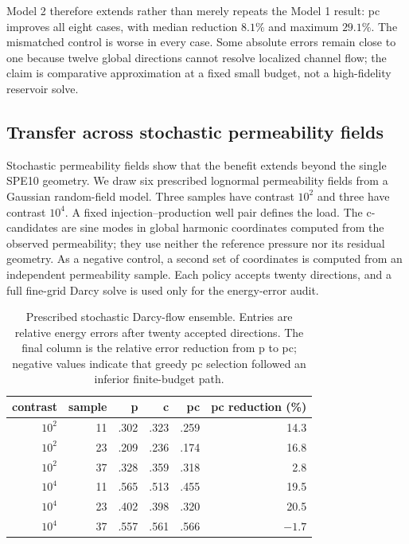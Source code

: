 \documentclass[11pt]{article}
\numberwithin{algorithm}{section}
\theoremstyle{definition}\newtheorem{definition}[theorem]{Definition}
\theoremstyle{remark}\newtheorem{remark}[theorem]{Remark}
\begin{document}
Model 2 therefore extends rather than merely repeats the Model 1 result: pc
improves all eight cases, with median reduction $8.1\%$ and maximum $29.1\%$.
The mismatched control is worse in every case.  Some absolute errors remain
close to one because twelve global directions cannot resolve localized
channel flow; the claim is comparative approximation at a fixed small budget,
not a high-fidelity reservoir solve.

\subsection{Transfer across stochastic permeability fields}
Stochastic permeability fields show that the benefit extends beyond the
single SPE10 geometry.  We draw six prescribed lognormal permeability fields from
a Gaussian random-field model.  Three samples have contrast $10^2$ and
three have contrast $10^4$.  A fixed injection--production well pair defines
the load.  The c-candidates are sine modes in global harmonic coordinates
computed from the observed permeability; they use neither the reference
pressure nor its residual geometry.  As a negative control, a second set of
coordinates is computed from an independent permeability sample.  Each
policy accepts twenty directions, and a full fine-grid Darcy solve is used
only for the energy-error audit.

\begin{table}[h]
\centering
\caption{Prescribed stochastic Darcy-flow ensemble.  Entries are relative energy
errors after twenty accepted directions.  The final column is the relative
error reduction from p to pc; negative values indicate that greedy pc selection
followed an inferior finite-budget path.}
\begin{tabular}{rrrrrr}
\toprule
contrast & sample & p & c & pc & pc reduction (\%)\\
\midrule
$10^2$ & 11 & .302 & .323 & .259 & 14.3\\
$10^2$ & 23 & .209 & .236 & .174 & 16.8\\
$10^2$ & 37 & .328 & .359 & .318 & 2.8\\
$10^4$ & 11 & .565 & .513 & .455 & 19.5\\
$10^4$ & 23 & .402 & .398 & .320 & 20.5\\
$10^4$ & 37 & .557 & .561 & .566 & $-1.7$\\
\bottomrule
\end{tabular}
\label{tab:stochastic-darcy}
\end{table}
\end{document}
